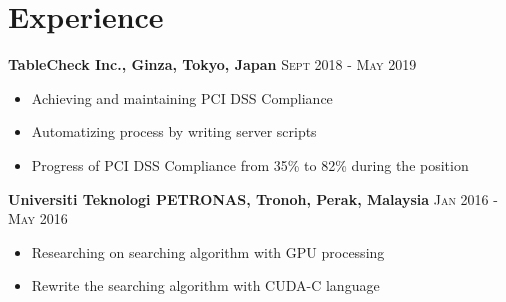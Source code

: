 \documentclass[English]{cv-style}
\begin{document}
\section{Experience}
\vspace{-0.3cm}
\textbf{TableCheck Inc., Ginza, Tokyo, Japan} 
    \quad \quad \quad \quad \quad \quad \quad \quad \quad 
    \quad \quad \quad \quad \quad \quad \quad \quad
\textsc{Sept 2018 - May 2019} \\
 \vspace{-0.15cm}
    \begin{itemize}[noitemsep]
        \item Achieving and maintaining PCI DSS Compliance
        \item Automatizing process by writing server scripts
        \item Progress of PCI DSS Compliance from 35\% to 82\% during the position
    \end{itemize}
\textbf{Universiti Teknologi PETRONAS, Tronoh, Perak, Malaysia} 
    \quad \quad \quad \quad \quad \quad \quad \quad \quad \quad
\textsc{Jan 2016 - May 2016} \\
 \vspace{-0.15cm}
    \begin{itemize}[noitemsep]
        \item Researching on searching algorithm with GPU processing
        \item Rewrite the searching algorithm with CUDA-C language
    \end{itemize}
\end{document}
